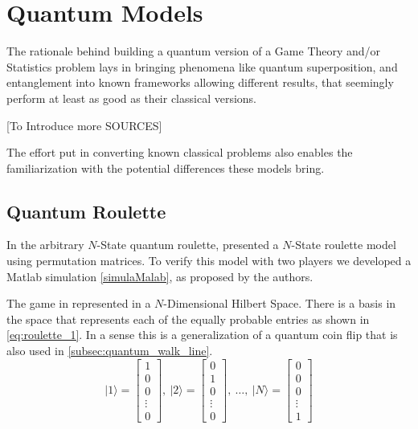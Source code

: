 \section{Quantum Models}
\label{sec:quantum_models}

The rationale behind building a quantum version of a Game Theory and/or Statistics problem lays in bringing phenomena like quantum superposition, and entanglement into known frameworks allowing different results, that seemingly perform at least as good as their classical versions.

[To Introduce more SOURCES]

The effort put in converting known classical problems also enables the familiarization with the potential differences these models bring.

\subsection{Quantum Roulette}
\label{subsec:quantum_roulette}

In the arbitrary $N$-State quantum roulette, \cite{} presented a $N$-State roulette model using permutation matrices.
To verify this model with two players we developed a Matlab simulation \ref{simulaMalab}, as proposed by the authors.

The game in represented in a $N$-Dimensional Hilbert Space. There is a basis in the space that represents each of the equally probable entries as shown in \ref{eq:roulette_1}. In a sense this is a generalization of a quantum coin flip that is also used in \ref{subsec:quantum_walk_line}.
\begin{equation}
\label{eq:roulette_1}
\vert1\rangle=\left[\begin{array}{c}
1\\
0\\
0\\
\vdots\\
0
\end{array}\right],\:\vert2\rangle=\left[\begin{array}{c}
0\\
1\\
0\\
\vdots\\
0
\end{array}\right],\:\ldots,\:\vert N\rangle=\left[\begin{array}{c}
0\\
0\\
0\\
\vdots\\
1
\end{array}\right]
\end{equation}

